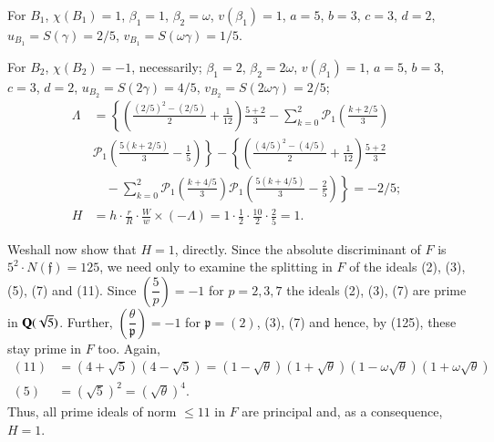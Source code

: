 For $B_{1}$, $\chi(B_{1})=1$, $\beta_{1}=1$, $\beta_{2}=\omega$,
$v(\beta_{1})=1$, $a=5$, $b=3$, $c=3$, $d=2$,
$u_{B_{1}}=S(\gamma)=2/5$, $v_{B_{1}}=S(\omega\gamma)=1/5$.

For $B_{2}$, $\chi(B_{2})=-1$, necessarily; $\beta_{1}=2$,
$\beta_{2}=2\omega$, $v(\beta_{1})=1$, $a=5$, $b=3$, $c=3$, $d=2$,
$u_{B_{2}}=S(2\gamma)=4/5$, $v_{B_{2}}=S(2\omega\gamma)=2/5$;
\begin{align*}
\Lambda &=
\left\{\left(\frac{(2/5)^{2}-(2/5)}{2}+\frac{1}{12}\right)\frac{5+2}{3}-
\sum^{2}_{k=0}\mathscr{P}_{1}\left(\frac{k+2/5}{3}\right)\right.\\
&\left.\mathscr{P}_{1}\left(\frac{5(k+2/5)}{3}-\frac{1}{5}\right)\right\}-
\left\{\left(\frac{(4/5)^{2}-(4/5)}{2}+\frac{1}{12}\right)\frac{5+2}{3}\right.\\
&\left.\quad-\sum^{2}_{k=0}\mathscr{P}_{1}\left(\frac{k+4/5}{3}\right)\mathscr{P}_{1}\left(\frac{5(k+4/5)}{3}-\frac{2}{5}\right)\right\}
= -2/5;\\
H &= h\cdot \frac{r}{R}\cdot \frac{W}{w}\times(-\Lambda)=1\cdot
\frac{1}{2}\cdot \frac{10}{2}\cdot \frac{2}{5}=1.
\end{align*}

We\pageoriginale shall now show that $H=1$, directly. Since the
absolute discriminant of $F$ is $5^{2}\cdot N(\mathfrak{f})=125$, we
need only to examine the splitting in $F$ of the ideals (2), (3), (5),
(7) and (11). Since $\left(\dfrac{5}{p}\right)=-1$ for $p=2,3,7$ the
ideals (2), (3), (7) are prime in $\mathbf{Q}(\sqrt{5})$. Further,
$\left(\dfrac{\theta}{\mathfrak{p}}\right)=-1$ for $\mathfrak{p}=(2)$,
(3), (7) and hence, by (125), these stay prime in $F$ too. Again, 
\begin{align*}
(11) &=
  (4+\sqrt{5})(4-\sqrt{5})=(1-\sqrt{\theta})(1+\sqrt{\theta})(1-\omega\sqrt{\theta})(1+\omega\sqrt{\theta})\\
(5) &= (\sqrt{5})^{2}=(\sqrt{\theta})^{4}. 
\end{align*}
Thus, all prime ideals of norm $\leq 11$ in $F$ are principal and, as
a consequence, $H=1$.

